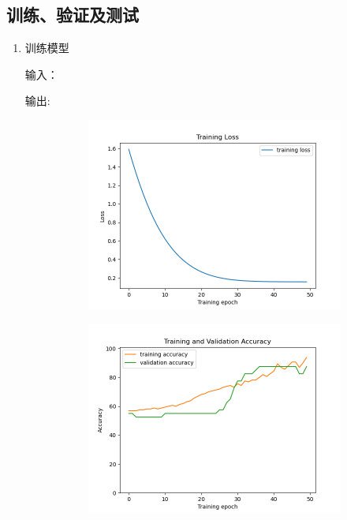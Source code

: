 \documentclass[a4paper]{article}
\begin{document}
\subsection{训练、验证及测试}
\begin{enumerate}
    \item 训练模型
    
    输入：
    
    输出:
    \begin{figure}[H]
        \centering
	        \begin{subfigure}[b]{.45\linewidth}
	            \includegraphics[width=\linewidth]{../../img/3-1.png}
	        \end{subfigure}
	        \begin{subfigure}[b]{.45\linewidth}
	            \includegraphics[width=\linewidth]{../../img/3-2.png}

\end{subfigure}
\end{figure}
\end{enumerate}
\end{document}
